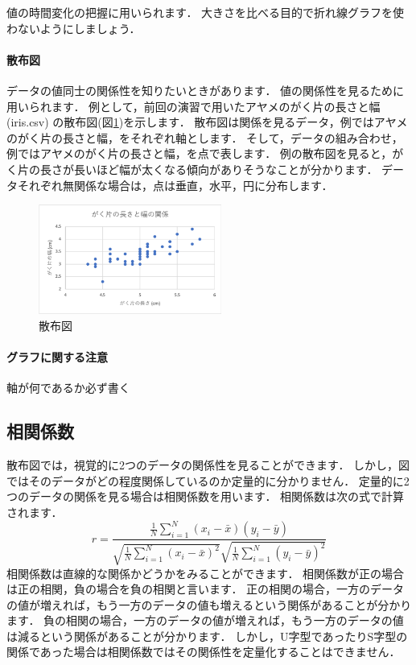 値の時間変化の把握に用いられます．
大きさを比べる目的で折れ線グラフを使わないようにしましょう．

\paragraph{散布図}

データの値同士の関係性を知りたいときがあります．
値の関係性を見るために用いられます．
例として，前回の演習で用いたアヤメのがく片の長さと幅 (iris.csv) の散布図(図\ref{fig:scatter})を示します．
散布図は関係を見るデータ，例ではアヤメのがく片の長さと幅，をそれぞれ軸とします．
そして，データの組み合わせ，例ではアヤメのがく片の長さと幅，を点で表します．
例の散布図を見ると，がく片の長さが長いほど幅が太くなる傾向がありそうなことが分かります．
データそれぞれ無関係な場合は，点は垂直，水平，円に分布します．

\begin{figure}[htbp]
    \centering
    \includegraphics[width=6cm]{chap2/scatter.png}
    \caption{散布図}
    \label{fig:scatter}
\end{figure}

\paragraph{グラフに関する注意}

軸が何であるか必ず書く

\subsection{相関係数}

散布図では，視覚的に2つのデータの関係性を見ることができます．
しかし，図ではそのデータがどの程度関係しているのか定量的に分かりません．
定量的に2つのデータの関係を見る場合は相関係数を用います．
相関係数は次の式で計算されます．
\begin{equation}
    \label{eq:1}
    r = \frac{\frac{1}{N} \sum_{i=1}^N (x_i - \bar{x})(y_i - \bar{y})}{\sqrt{\frac{1}{N} \sum_{i=1}^N (x_i - \bar{x})^2} \sqrt{\frac{1}{N} \sum_{i=1}^N(y_i - \bar{y})^2}}
\end{equation}
相関係数は直線的な関係かどうかをみることができます．
相関係数が正の場合は正の相関，負の場合を負の相関と言います．
正の相関の場合，一方のデータの値が増えれば，もう一方のデータの値も増えるという関係があることが分かります．
負の相関の場合，一方のデータの値が増えれば，もう一方のデータの値は減るという関係があることが分かります．
しかし，U字型であったりS字型の関係であった場合は相関係数ではその関係性を定量化することはできません．

